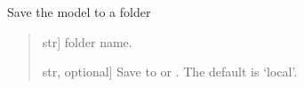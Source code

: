 \documentclass[letterpaper,10pt,english]{sphinxmanual}
\begin{document}
\begin{fulllineitems}
\begin{fulllineitems}
\end{fulllineitems}


\begin{fulllineitems}
\label{\detokenize{model:pywfe.Model.save}}
\pysigstartsignatures
{}
\pysigstopsignatures
\sphinxAtStartPar
Save the model to a folder
\begin{quote}\begin{description}
\begin{description}
\sphinxlineitem{\sphinxstylestrong{folder}}{[}str{]}
\sphinxAtStartPar
folder name.

\sphinxlineitem{\sphinxstylestrong{source}}{[}str, optional{]}
\sphinxAtStartPar
Save to  or . The default is ‘local’.

\end{description}

\begin{description}
\end{description}

\end{description}\end{quote}

\end{fulllineitems}


\end{fulllineitems}


\sphinxstepscope
\end{document}
